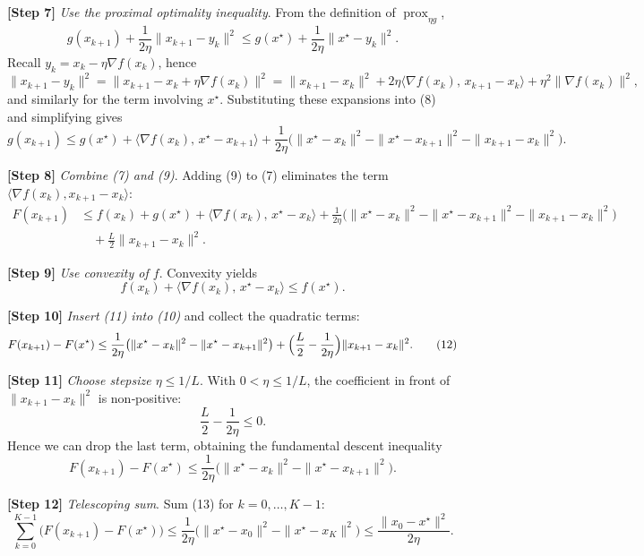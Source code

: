 \documentclass{article}
\newcommand{\prox}{\operatorname{prox}}
\begin{document}
\noindent\textbf{[Step 7]}  \textit{Use the proximal optimality inequality}.  
From the definition of $\prox_{\eta g}$,
\[
g(x_{k+1})+\frac{1}{2\eta}\|x_{k+1}-y_{k}\|^{2}
\le g(x^{\star})+\frac{1}{2\eta}\|x^{\star}-y_{k}\|^{2}.
\tag{8}
\]
Recall $y_{k}=x_{k}-\eta\nabla f(x_{k})$, hence
\[
\|x_{k+1}-y_{k}\|^{2}= \|x_{k+1}-x_{k}+\eta\nabla f(x_{k})\|^{2}
= \|x_{k+1}-x_{k}\|^{2}+2\eta\langle \nabla f(x_{k}),\,x_{k+1}-x_{k}\rangle+\eta^{2}\|\nabla f(x_{k})\|^{2},
\]
and similarly for the term involving $x^{\star}$. Substituting these expansions into (8) and simplifying gives
\[
g(x_{k+1})\le g(x^{\star})+\langle \nabla f(x_{k}),\,x^{\star}-x_{k+1}\rangle
+\frac{1}{2\eta}\bigl(\|x^{\star}-x_{k}\|^{2}-\|x^{\star}-x_{k+1}\|^{2}
-\|x_{k+1}-x_{k}\|^{2}\bigr).
\tag{9}
\]

\noindent\textbf{[Step 8]}  \textit{Combine (7) and (9)}.  Adding (9) to (7) eliminates the term $\langle \nabla f(x_{k}),x_{k+1}-x_{k}\rangle$:
\[
\begin{aligned}
F(x_{k+1}) &\le f(x_{k})+g(x^{\star})
+\langle \nabla f(x_{k}),\,x^{\star}-x_{k}\rangle
+\frac{1}{2\eta}\bigl(\|x^{\star}-x_{k}\|^{2}
-\|x^{\star}-x_{k+1}\|^{2}
-\|x_{k+1}-x_{k}\|^{2}\bigr) \\
&\quad +\frac{L}{2}\|x_{k+1}-x_{k}\|^{2}.
\end{aligned}
\tag{10}
\]

\noindent\textbf{[Step 9]}  \textit{Use convexity of $f$}.  
Convexity yields
\[
f(x_{k})+ \langle \nabla f(x_{k}),\,x^{\star}-x_{k}\rangle \le f(x^{\star}).
\tag{11}
\]

\noindent\textbf{[Step 10]}  \textit{Insert (11) into (10)} and collect the quadratic terms:
\[
F(x_{k+1})-F(x^{\star})
\le \frac{1}{2\eta}\bigl(\|x^{\star}-x_{k}\|^{2}
-\|x^{\star}-x_{k+1}\|^{2}\bigr)
+\Bigl(\frac{L}{2}-\frac{1}{2\eta}\Bigr)\|x_{k+1}-x_{k}\|^{2}.
\tag{12}
\]

\noindent\textbf{[Step 11]}  \textit{Choose stepsize $\eta\le 1/L$}.  
With $0<\eta\le 1/L$, the coefficient in front of $\|x_{k+1}-x_{k}\|^{2}$ is non‑positive:
\[
\frac{L}{2}-\frac{1}{2\eta}\le 0.
\]
Hence we can drop the last term, obtaining the fundamental descent inequality
\[
F(x_{k+1})-F(x^{\star})
\le \frac{1}{2\eta}\bigl(\|x^{\star}-x_{k}\|^{2}
-\|x^{\star}-x_{k+1}\|^{2}\bigr).
\tag{13}
\]

\noindent\textbf{[Step 12]}  \textit{Telescoping sum}.  
Sum (13) for $k=0,\dots, K-1$:
\[
\sum_{k=0}^{K-1}\bigl(F(x_{k+1})-F(x^{\star})\bigr)
\le \frac{1}{2\eta}\bigl(\|x^{\star}-x_{0}\|^{2}
-\|x^{\star}-x_{K}\|^{2}\bigr)
\le \frac{\|x_{0}-x^{\star}\|^{2}}{2\eta}.
\tag{14}
\]
\end{document}

